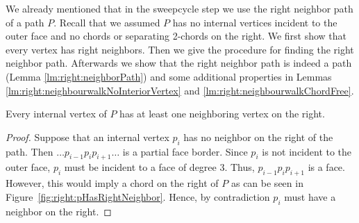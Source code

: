     We already mentioned that in the sweepcycle step we use the right neighbor path of a path $P$. Recall that we assumed $P$ has no internal vertices incident to the outer face and no chords or separating 2-chords on the right.
    We first show that every vertex has right neighbors.
    Then we give the procedure for finding the right neighbor path.
    Afterwards we show that the right neighbor path is indeed a path (Lemma \ref{lm:right:neighborPath}) and some additional properties in Lemmas \ref{lm:right:neighbourwalkNoInteriorVertex} and \ref{lm:right:neighbourwalkChordFree}.

    \begin{lemma}
      \label{lm:right:pHasRightNeihgbours}
      Every internal vertex of $P$ has at least one neighboring vertex on the right.
    \end{lemma}

    \begin{proof}
      Suppose that an internal vertex $p_i$ has no neighbor on the right of the path. Then $ \ldots p_{i-1} p_i p_{i+1} \ldots $ is a partial face border. Since $p_i$ is not incident to the outer face, $p_i$ must be incident to a face of degree $3$. Thus, $p_{i-1} p_i p_{i+1}$ is a face. However, this would imply a chord on the right of $P$ as can be seen in Figure~\ref{fig:right:pHasRightNeighbor}. Hence, by contradiction $p_i$ must have a neighbor on the right.
    \end{proof}

